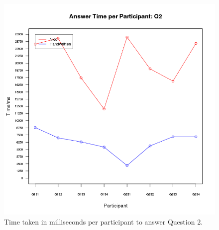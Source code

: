 \documentclass[12pt,twoside,notitlepage,xetex]{report}
\begin{document}
\begin{center}
\begin{figure}[H]
\begin{center}
\includegraphics[height=\textheight/2-2cm]{figs/graphs/q2.png}
\end{center}
\caption{Time taken in milliseconds per participant to answer Question 2.}
\end{figure}
\end{center}
\end{document}
